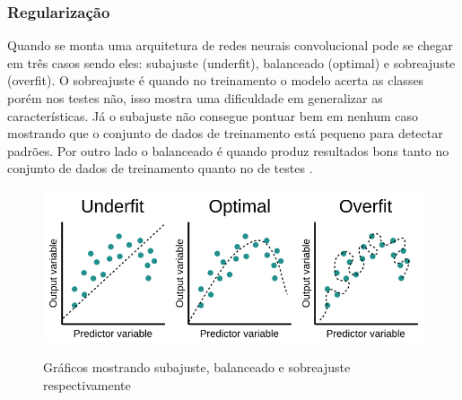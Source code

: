 \subsubsection*{Regularização}

Quando se monta uma arquitetura de redes neurais convolucional pode se chegar em três casos sendo eles: subajuste (underfit), balanceado (optimal) e sobreajuste (overfit). O sobreajuste é quando no treinamento o modelo acerta as classes porém nos testes não, isso mostra uma dificuldade em generalizar as características. Já o subajuste não consegue pontuar bem em nenhum caso mostrando que o conjunto de dados de treinamento está pequeno para detectar padrões. Por outro lado o balanceado é quando produz resultados bons tanto no conjunto de dados de treinamento quanto no de testes \cite{Alzubaidi2021, computation11030052}.

\begin{figure}[H]
	\caption{Gráficos mostrando subajuste, balanceado e sobreajuste respectivamente} 
	\centering %
	\includegraphics[width=15cm]{figures/fittings.png} %
	\label{fig:arquitetura_cnn}
\end{figure}



